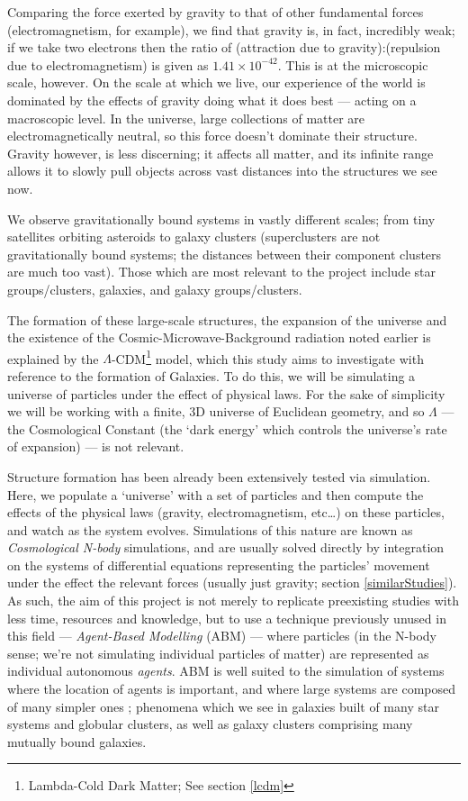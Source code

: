 \documentclass[11pt,a4paper]{article}
\begin{document}
Comparing the force exerted by gravity to that of other fundamental forces (electromagnetism, for example), we find that gravity is, in fact, incredibly weak; if we take two electrons then the ratio of (attraction due to gravity):(repulsion due to electromagnetism) is given as $1.41\times 10^{-42}$\cite{Fe64}. This is at the microscopic scale, however. On the scale at which we live, our experience of the world is dominated by the effects of gravity doing what it does best --- acting on a macroscopic level. In the universe, large collections of matter are electromagnetically neutral, so this force doesn't dominate their structure. Gravity however, is less discerning; it affects all matter, and its infinite range allows it to slowly pull objects across vast distances into the structures we see now.

We observe gravitationally bound systems in vastly different scales; from tiny satellites orbiting asteroids to galaxy clusters (superclusters are not gravitationally bound systems; the distances between their component clusters are much too vast). Those which are most relevant to the project include star groups/clusters, galaxies, and galaxy groups/clusters.

The formation of these large-scale structures, the expansion of the universe and the existence of the Cosmic-Microwave-Background radiation noted earlier is explained by the $\Lambda$-CDM\footnote{Lambda-Cold Dark Matter; See section \ref{lcdm}} model, which this study aims to investigate with reference to the formation of Galaxies. To do this, we will be simulating a universe of particles under the effect of physical laws. For the sake of simplicity we will be working with a finite, 3D universe of Euclidean geometry, and so $\Lambda$ --- the Cosmological Constant (the `dark energy' which controls the universe's rate of expansion) --- is not relevant.
 
Structure formation has been already been extensively tested via simulation. Here, we populate a `universe' with a set of particles and then compute the effects of the physical laws (gravity, electromagnetism, etc\ldots) on these particles, and watch as the system evolves. Simulations of this nature are known as \emph{Cosmological N-body} simulations, and are usually solved directly by integration on the systems of differential equations representing the particles' movement under the effect the relevant forces (usually just gravity; section \ref{similarStudies}). As such, the aim of this project is not merely to replicate preexisting studies with less time, resources and knowledge, but to use a technique previously unused in this field --- \emph{Agent-Based Modelling} (ABM) --- where particles (in the N-body sense; we're not simulating individual particles of matter) are represented as individual autonomous \emph{agents}. ABM is well suited to the simulation of systems where the location of agents is important, and where large systems are composed of many simpler ones \cite{abmPresentation}; phenomena which we see in galaxies built of many star systems and globular clusters, as well as galaxy clusters comprising many mutually bound galaxies. 
\end{document}
